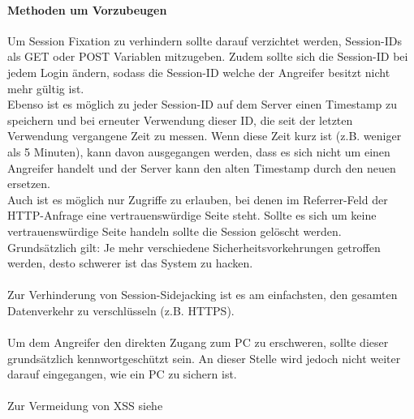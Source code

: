 \paragraph{Methoden um Vorzubeugen}
Um Session Fixation zu verhindern sollte darauf verzichtet werden, Session-IDs als GET oder POST Variablen mitzugeben. Zudem sollte sich die Session-ID bei jedem Login ändern, sodass die Session-ID welche der Angreifer besitzt nicht mehr gültig ist.\\ Ebenso ist es möglich zu jeder Session-ID auf dem Server einen Timestamp zu speichern und bei erneuter Verwendung dieser ID, die seit der letzten Verwendung vergangene Zeit zu messen. Wenn diese Zeit kurz ist (z.B. weniger als 5 Minuten), kann davon ausgegangen werden, dass es sich nicht um einen Angreifer handelt und der Server kann den alten Timestamp durch den neuen ersetzen.\\ Auch ist es möglich nur Zugriffe zu erlauben, bei denen im Referrer-Feld der HTTP-Anfrage eine vertrauenswürdige Seite steht. Sollte es sich um keine vertrauenswürdige Seite handeln sollte die Session gelöscht werden.\\
Grundsätzlich gilt: Je mehr verschiedene Sicherheitsvorkehrungen getroffen werden, desto schwerer ist das System zu hacken.\\\\
Zur Verhinderung von Session-Sidejacking ist es am einfachsten, den gesamten Datenverkehr zu verschlüsseln (z.B. HTTPS). \\\\
Um dem Angreifer den direkten Zugang zum PC zu erschweren, sollte dieser grundsätzlich kennwortgeschützt sein. An dieser Stelle wird jedoch nicht weiter darauf eingegangen, wie ein PC zu sichern ist.\\\\
Zur Vermeidung von XSS siehe 